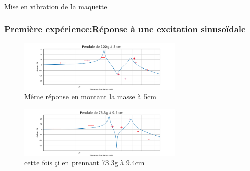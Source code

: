\documentclass{beamer}
\begin{document}
	
	\begin{frame}{Mise en vibration de la maquette}
		\frametitle{Première expérience:Réponse à une excitation sinusoïdale}	
		\centering
		\begin{figure}
			\includegraphics[width=0.7\textwidth]{Image Noé/Données pi avec comparaison (Noé)/Pendule 100g à 5 cm.png}
			\caption{Même réponse en montant la masse à 5cm}
		\end{figure}
			
		\centering
		\begin{figure}
			\includegraphics[width=0.7\textwidth]{Image Noé/Données pi avec comparaison (Noé)/Pendule 73.3g à 9,4 cm.png}
			\caption{cette fois çi en prennant 73.3g à 9.4cm}
		\end{figure}
		
		
		
	\end{frame}
	
	
	
\end{document}
